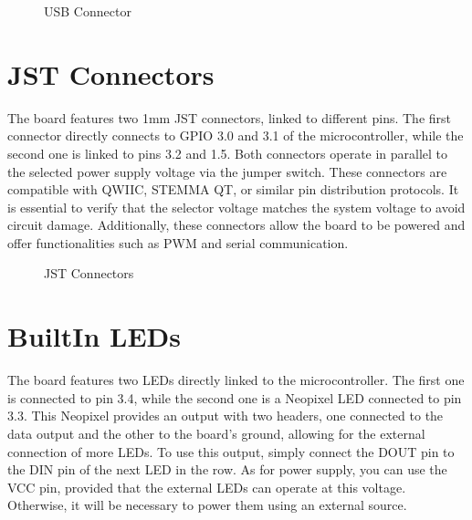 \documentclass[letterpaper,10pt,english]{sphinxmanual}
\begin{document}
\begin{figure}[htbp]
\centering
\capstart

\noindent{}
\caption{USB Connector}\label{\detokenize{generalboardcontrol:id2}}\label{\detokenize{generalboardcontrol:selector}}\end{figure}


\section{JST Connectors}
\label{\detokenize{generalboardcontrol:jst-connectors}}
\sphinxAtStartPar
The board features two 1mm JST connectors, linked to different pins. The first connector directly connects to GPIO 3.0 and 3.1 of the microcontroller, while the second one is linked to pins 3.2 and 1.5. Both connectors operate in parallel to the selected power supply voltage via the jumper switch. These connectors are compatible with QWIIC, STEMMA QT, or similar pin distribution protocols. It is essential to verify that the selector voltage matches the system voltage to avoid circuit damage. Additionally, these connectors allow the board to be powered and offer functionalities such as PWM and serial communication.

\begin{figure}[htbp]
\centering
\capstart

\noindent{}
\caption{JST Connectors}\label{\detokenize{generalboardcontrol:id3}}\label{\detokenize{generalboardcontrol:jst}}\end{figure}


\section{Built\sphinxhyphen{}In LEDs}
\label{\detokenize{generalboardcontrol:built-in-leds}}
\sphinxAtStartPar
The board features two LEDs directly linked to the microcontroller. The first one is connected to pin 3.4, while the second one is a Neopixel LED connected to pin 3.3. This Neopixel provides an output with two headers, one connected to the data output and the other to the board’s ground, allowing for the external connection of more LEDs. To use this output, simply connect the DOUT pin to the DIN pin of the next LED in the row. As for power supply, you can use the VCC pin, provided that the external LEDs can operate at this voltage. Otherwise, it will be necessary to power them using an external source.
\end{document}
